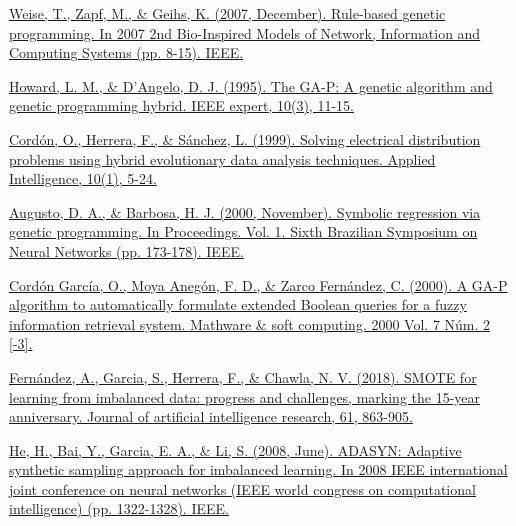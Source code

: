 \begin{thebibliography}{9}
	\href{https://ieeexplore.ieee.org/abstract/document/4610073}{Weise, T., Zapf, M., \& Geihs, K. (2007, December). Rule-based genetic programming. In 2007 2nd Bio-Inspired Models of Network, Information and Computing Systems (pp. 8-15). IEEE.}


	\href{https://ieeexplore.ieee.org/stamp/stamp.jsp?tp=&arnumber=393137}{Howard, L. M., \& D'Angelo, D. J. (1995). The GA-P: A genetic algorithm and genetic programming hybrid. IEEE expert, 10(3), 11-15.}


	\href{https://link.springer.com/article/10.1023/A:1008384630089}{Cordón, O., Herrera, F., \& Sánchez, L. (1999). Solving electrical distribution problems using hybrid evolutionary data analysis techniques. Applied Intelligence, 10(1), 5-24.}



	\href{https://ieeexplore.ieee.org/document/889734}{Augusto, D. A., \& Barbosa, H. J. (2000, November). Symbolic regression via genetic programming. In Proceedings. Vol. 1. Sixth Brazilian Symposium on Neural Networks (pp. 173-178). IEEE.}


	\href{https://upcommons.upc.edu/handle/2099/3586}{Cordón García, O., Moya Anegón, F. D., \& Zarco Fernández, C. (2000). A GA-P algorithm to automatically formulate extended Boolean queries for a fuzzy information retrieval system. Mathware \& soft computing. 2000 Vol. 7 Núm. 2 [-3].}



	\href{https://www.jair.org/index.php/jair/article/view/11192}{Fernández, A., Garcia, S., Herrera, F., \& Chawla, N. V. (2018). SMOTE for learning from imbalanced data: progress and challenges, marking the 15-year anniversary. Journal of artificial intelligence research, 61, 863-905.}


	\href{https://ieeexplore.ieee.org/abstract/document/4633969}{He, H., Bai, Y., Garcia, E. A., \& Li, S. (2008, June). ADASYN: Adaptive synthetic sampling approach for imbalanced learning. In 2008 IEEE international joint conference on neural networks (IEEE world congress on computational intelligence) (pp. 1322-1328). IEEE.}





\end{thebibliography}
